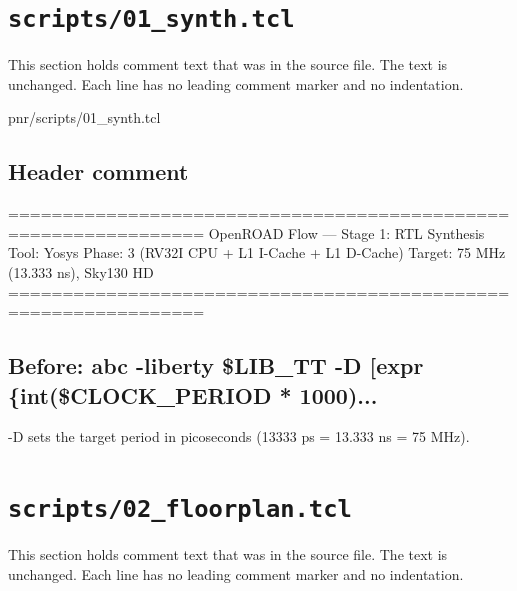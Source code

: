 \section{\texttt{scripts/01\_synth.tcl}}\label{tm:pd:scripts-01-synth-tcl}

This section holds comment text that was in the source file. The text is unchanged. Each line has no leading comment marker and no indentation.

\begin{relocated}{pnr/scripts/01_synth.tcl}

\subsection*{Header comment}

\begin{textblock}
================================================================
OpenROAD Flow — Stage 1: RTL Synthesis
Tool: Yosys
Phase: 3 (RV32I CPU + L1 I-Cache + L1 D-Cache)
Target: 75 MHz (13.333 ns), Sky130 HD
================================================================
\end{textblock}

\subsection*{Before: abc -liberty \$LIB\_TT -D [expr \{int(\$CLOCK\_PERIOD * 1000)...}

\begin{textblock}
-D sets the target period in picoseconds (13333 ps = 13.333 ns = 75 MHz).
\end{textblock}

\end{relocated}

\section{\texttt{scripts/02\_floorplan.tcl}}\label{tm:pd:scripts-02-floorplan-tcl}

This section holds comment text that was in the source file. The text is unchanged. Each line has no leading comment marker and no indentation.

